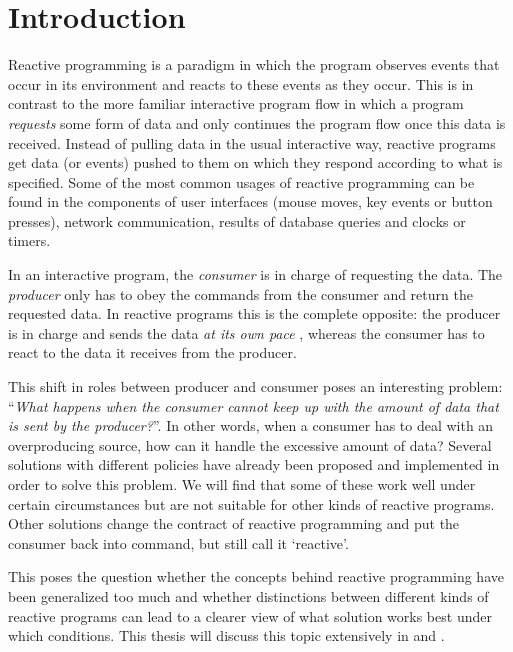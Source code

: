 \chapter*{Introduction}

Reactive programming is a paradigm in which the program observes events that occur in its environment and reacts to these events as they occur. This is in contrast to the more familiar interactive program flow in which a program \emph{requests} some form of data and only continues the program flow once this data is received. Instead of pulling data in the usual interactive way, reactive programs get data (or events) pushed to them on which they respond according to what is specified. Some of the most common usages of reactive programming can be found in the components of user interfaces (mouse moves, key events or button presses), network communication, results of database queries and clocks or timers. \cite{meijer2012-YMIAD}

In an interactive program, the \textit{consumer} is in charge of requesting the data. The \textit{producer} only has to obey the commands from the consumer and return the requested data. In reactive programs this is the complete opposite: the producer is in charge and sends the data \emph{at its own pace} \cite{berry1991-Reactive}, whereas the consumer has to react to the data it receives from the producer.

This shift in roles between producer and consumer poses an interesting problem: ``\textit{What happens when the consumer cannot keep up with the amount of data that is sent by the producer?}''. In other words, when a consumer has to deal with an overproducing source, how can it handle the excessive amount of data? Several solutions with different policies have already been proposed and implemented in order to solve this problem. We will find that some of these work well under certain circumstances but are not suitable for other kinds of reactive programs. Other solutions change the contract of reactive programming and put the consumer back into command, but still call it `reactive'.

This poses the question whether the concepts behind reactive programming have been generalized too much and whether distinctions between different kinds of reactive programs can lead to a clearer view of what solution works best under which conditions. This thesis will discuss this topic extensively in  and .

